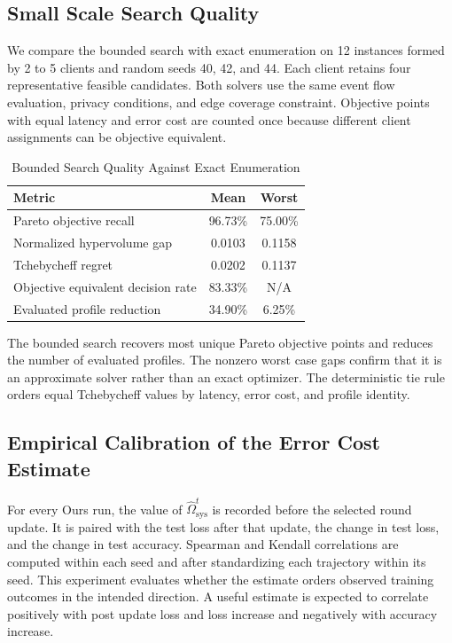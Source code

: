 \documentclass[5p,times]{elsarticle}
\theoremstyle{plain}
\theoremstyle{definition}
\theoremstyle{remark}
\begin{document}
\subsection{Small Scale Search Quality}
\label{sec:pareto_quality}

We compare the bounded search with exact enumeration on 12 instances formed by
2 to 5 clients and random seeds 40, 42, and 44. Each client retains four
representative feasible candidates. Both solvers use the same event flow
evaluation, privacy conditions, and edge coverage constraint. Objective points
with equal latency and error cost are counted once because different client
assignments can be objective equivalent.

\begin{table}[t]
\centering
\caption{Bounded Search Quality Against Exact Enumeration}
\label{tab:pareto_quality}
\small
\begin{tabular}{lcc}
\hline
\textbf{Metric} & \textbf{Mean} & \textbf{Worst} \\
\hline
Pareto objective recall & 96.73\% & 75.00\% \\
Normalized hypervolume gap & 0.0103 & 0.1158 \\
Tchebycheff regret & 0.0202 & 0.1137 \\
Objective equivalent decision rate & 83.33\% & \multicolumn{1}{c}{N/A} \\
Evaluated profile reduction & 34.90\% & 6.25\% \\
\hline
\end{tabular}
\end{table}

The bounded search recovers most unique Pareto objective points and reduces the
number of evaluated profiles. The nonzero worst case gaps confirm that it is an
approximate solver rather than an exact optimizer. The deterministic tie rule
orders equal Tchebycheff values by latency, error cost, and profile identity.

\subsection{Empirical Calibration of the Error Cost Estimate}
For every Ours run, the value of
$\widehat\Omega_{\mathrm{sys}}^t$ is recorded before the selected round update.
It is paired with the test loss after that update, the change in test loss, and
the change in test accuracy. Spearman and Kendall correlations are computed
within each seed and after standardizing each trajectory within its seed. This
experiment evaluates whether the estimate orders observed training outcomes in
the intended direction. A useful estimate is expected to correlate positively
with post update loss and loss increase and negatively with accuracy increase.
\end{document}
